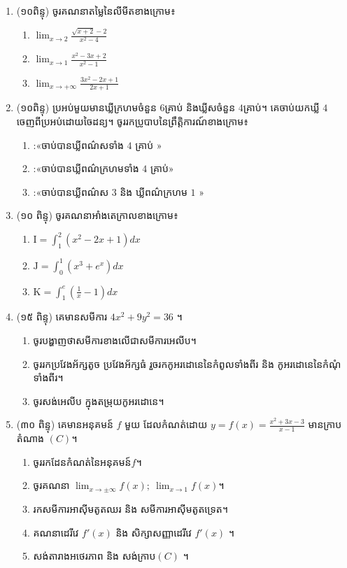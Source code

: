 \documentclass{officialexam}
\begin{document}
\newpage 
\maketitle 
\begin{enumerate}[I]
\item (១០ពិន្ទុ) ចូរគណនាតម្លៃនៃលីមីតខាងក្រោម៖
\begin{enumerate}[k,3]
\item  $\lim_{x\to 2}\frac{\sqrt{x+2}-2}{x^2-4}$
\item $\lim_{x\to 1}\frac{x^2-3x+2}{x^2-1}$
\item $\lim_{x\to +\infty}\frac{3x^2-2x+1}{2x+1}$
\end{enumerate}
\item (១០ពិន្ទុ) ប្រអប់មួយមានឃ្លីក្រហមចំនួន $6$គ្រាប់ និងឃ្លីសចំនួន $4$គ្រាប់។ គេចាប់យកឃ្លី $4$ ចេញពីប្រអប់ដោយចៃដន្យ។ ចូររកប្រូបាបនៃព្រឹត្តិការណ៍ខាងក្រោម៖
\begin{enumerate}[A]
\item :«ចាប់បានឃ្លីពណ៌សទាំង $4$ គ្រាប់ »
\item :«ចាប់បានឃ្លីពណ៌ក្រហមទាំង $4$ គ្រាប់»
\item :«ចាប់បានឃ្លីពណ៌ស $3$ និង ឃ្លីពណ៌ក្រហម $1$ »
\end{enumerate}
\item (១០ ពិន្ទុ) ចូរគណនាអាំងតេក្រាលខាងក្រោម៖
\begin{enumerate}[k,3]
\item $\mathrm{I}=\int_1^2 \left(x^2-2x+1\right) dx$
\item $\mathrm{J}=\int_0^1\left(x^3+e^x\right)dx $
\item $\mathrm{K}=\int_1^e\left(\frac{1}{x}-1\right)dx$
\end{enumerate}
\item (១៥ ពិន្ទុ) គេមានសមីការ $4x^2+9y^2=36$ ។
\begin{enumerate}
\item ចូរបង្ហាញថាសមីការខាងលើជាសមីការអេលីប។ 
\item ចូររកប្រវែងអ័ក្សតូច ប្រវែងអ័ក្សធំ រួចរកកូអរដោនេនៃកំពូលទាំងពីរ និង កូអរដោនេនៃកំណុំទាំងពីរ។
\item ចូរសង់អេលីប ក្នុងតម្រុយកូអរដោនេ។
\end{enumerate}
\item (៣០ ពិន្ទុ)  គេមានអនុគមន៍ $f$ មួយ ដែលកំណត់ដោយ $y=f(x)=\frac{x^2+3x-3}{x-1}$ មានក្រាបតំណាង $(C)$។
\begin{enumerate}[k]
\item ចូររកដែនកំណត់នៃអនុគមន៍$f$។
\item ចូរគណនា $\lim_{x\to \pm \infty}f(x);\ \lim_{x\to 1}f(x)$។ 
\item រកសមីការអាស៊ីមតូតឈរ និង សមីការអាស៊ីមតូតទ្រេត។
\item គណនាដេរីវេ $f'(x)$ និង សិក្សាសញ្ញាដេរីវេ $f'(x)$ ។
\item សង់តារាងអថេរភាព និង សង់ក្រាប$(C)$ ។ 
\end{enumerate}
\end{enumerate}
\end{document}
